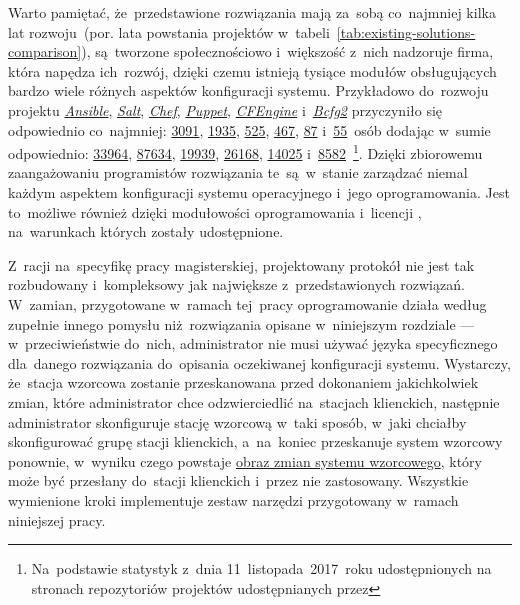 \documentclass[thesis]{subfiles}
\begin{document}
Warto pamiętać, że~przedstawione rozwiązania mają za~sobą co~najmniej kilka lat rozwoju~(por. lata powstania projektów w~tabeli~\ref{tab:existing-solutions-comparison}), są~tworzone społecznościowo i~większość z~nich nadzoruje firma, która napędza ich~rozwój, dzięki czemu istnieją tysiące modułów obsługujących bardzo wiele różnych aspektów konfiguracji systemu. Przykładowo do~rozwoju projektu \emph{\hyperref[sec:ansible]{Ansible}}, \emph{\hyperref[sec:salt]{Salt}}, \emph{\hyperref[sec:chef]{Chef}}, \emph{\hyperref[sec:puppet]{Puppet}}, \emph{\hyperref[itm:cfengine]{CFEngine}} i~\emph{\hyperref[itm:bcfg2]{Bcfg2}} przyczyniło się odpowiednio co~najmniej: \href{https://github.com/ansible/ansible}{3091}, \href{https://github.com/saltstack/salt}{1935}, \href{https://github.com/chef/chef}{525}, \href{https://github.com/puppetlabs/puppet}{467}, \href{https://github.com/cfengine/core}{87} i~\href{https://github.com/Bcfg2/bcfg2}{55}~osób dodając w~sumie odpowiednio: \href{https://github.com/ansible/ansible}{33964}, \href{https://github.com/saltstack/salt}{87634}, \href{https://github.com/chef/chef}{19939}, \href{https://github.com/puppetlabs/puppet}{26168}, \href{https://github.com/cfengine/core}{14025} i~\href{https://github.com/Bcfg2/bcfg2}{8582}~\footnote{Na~podstawie statystyk z~dnia 11~listopada~2017~roku udostępnionych na stronach repozytoriów projektów udostępnianych przez }. Dzięki zbiorowemu zaangażowaniu programistów rozwiązania te~są~w~stanie zarządzać niemal każdym aspektem konfiguracji systemu operacyjnego i~jego oprogramowania. Jest to~możliwe również dzięki modułowości oprogramowania i~licencji \emph{}, na~warunkach których zostały udostępnione.


Z~racji na~specyfikę pracy magisterskiej, projektowany protokół nie jest tak rozbudowany i~kompleksowy jak największe z~przedstawionych rozwiązań. W~zamian, przygotowane w~ramach tej~pracy oprogramowanie działa według zupełnie innego pomysłu niż~rozwiązania opisane w~niniejszym rozdziale --- w~przeciwieństwie do~nich, administrator nie musi używać języka specyficznego dla~danego rozwiązania do~opisania oczekiwanej konfiguracji systemu. Wystarczy, że~stacja wzorcowa zostanie przeskanowana przed dokonaniem jakichkolwiek zmian, które administrator chce odzwierciedlić na~stacjach klienckich, następnie administrator skonfiguruje stację wzorcową w~taki sposób, w~jaki chciałby skonfigurować grupę stacji klienckich, a~na~koniec przeskanuje system wzorcowy ponownie, w~wyniku czego powstaje \hyperref[sec:obraz-zmian-konfiguracji]{obraz zmian systemu wzorcowego}, który może być przesłany do~stacji klienckich i~przez nie zastosowany. Wszystkie wymienione kroki implementuje zestaw narzędzi przygotowany w~ramach niniejszej pracy.
\end{document}
